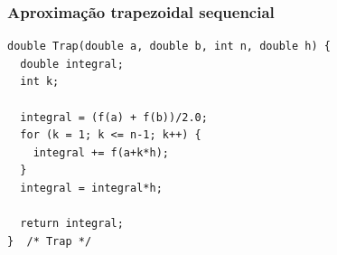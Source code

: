 \documentclass[xcolor={usenames,dvipsnames},12pt,presentation,aspectratio=169]{beamer}
\begin{document}
\begin{frame}[fragile]
  \frametitle{Aproximação trapezoidal sequencial}
\begin{center}
\begin{minipage}{0.95\textwidth}
  \begin{verbatim}
double Trap(double a, double b, int n, double h) {
  double integral;
  int k;

  integral = (f(a) + f(b))/2.0;
  for (k = 1; k <= n-1; k++) {
    integral += f(a+k*h);
  }
  integral = integral*h;

  return integral;
}  /* Trap */   
  \end{verbatim}
\end{minipage}
\end{center}
\end{frame}
% 
% 
% 
% 
% 
% 
\end{document}
